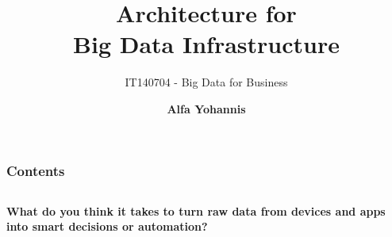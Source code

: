 \documentclass[aspectratio=169, table]{beamer}
\title{\Huge Architecture for\\
	\vspace{10pt}
	Big Data Infrastructure}
\subtitle{IT140704 - Big Data for Business}
\author{\textbf{Alfa Yohannis}}
\begin{document}
	
	\frame{\titlepage}
	
	
	\begin{frame}[fragile]
		\frametitle{Contents}
		\vspace{20pt}
		\begin{columns}[t]
			\tableofcontents[sections={1-6}]
			
			\tableofcontents[sections={7-12}]
		\end{columns}
	\end{frame}


\begin{frame}{\hfill}
	\centering
	\Huge{\textbf{What do you think it takes to turn raw data from devices and apps into smart decisions or automation?}}
\end{frame}

	
\end{document}
